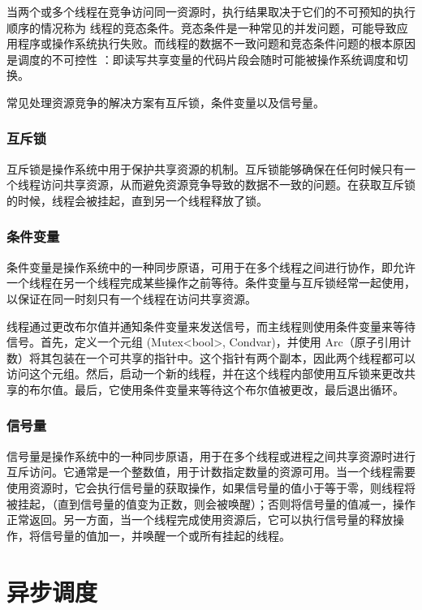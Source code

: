 当两个或多个线程在竞争访问同一资源时，执行结果取决于它们的不可预知的执行顺序的情况称为 线程的竞态条件。竞态条件是一种常见的并发问题，可能导致应用程序或操作系统执行失败。而线程的数据不一致问题和竞态条件问题的根本原因是调度的不可控性 ：即读写共享变量的代码片段会随时可能被操作系统调度和切换。

常见处理资源竞争的解决方案有互斥锁，条件变量以及信号量。

\subsubsection{互斥锁}

互斥锁是操作系统中用于保护共享资源的机制。互斥锁能够确保在任何时候只有一个线程访问共享资源，从而避免资源竞争导致的数据不一致的问题。在获取互斥锁的时候，线程会被挂起，直到另一个线程释放了锁。

\subsubsection{条件变量}

条件变量是操作系统中的一种同步原语，可用于在多个线程之间进行协作，即允许一个线程在另一个线程完成某些操作之前等待。条件变量与互斥锁经常一起使用，以保证在同一时刻只有一个线程在访问共享资源。

线程通过更改布尔值并通知条件变量来发送信号，而主线程则使用条件变量来等待信号。首先，定义一个元组 (Mutex<bool>, Condvar)，并使用 Arc（原子引用计数）将其包装在一个可共享的指针中。这个指针有两个副本，因此两个线程都可以访问这个元组。然后，启动一个新的线程，并在这个线程内部使用互斥锁来更改共享的布尔值。最后，它使用条件变量来等待这个布尔值被更改，最后退出循环。

\subsubsection{信号量}

信号量是操作系统中的一种同步原语，用于在多个线程或进程之间共享资源时进行互斥访问。它通常是一个整数值，用于计数指定数量的资源可用。当一个线程需要使用资源时，它会执行信号量的获取操作，如果信号量的值小于等于零，则线程将被挂起，（直到信号量的值变为正数，则会被唤醒）；否则将信号量的值减一，操作正常返回。另一方面，当一个线程完成使用资源后，它可以执行信号量的释放操作，将信号量的值加一，并唤醒一个或所有挂起的线程。

\section{异步调度}

